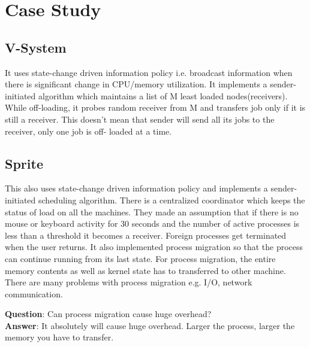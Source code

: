 \documentclass[twoside]{article}
\begin{document}
\section{Case Study}
\subsection{V-System}
It uses state-change driven information policy i.e. broadcast information when there is significant change in CPU/memory utilization. It implements a sender-initiated algorithm which maintains a list of M least loaded nodes(receivers). While off-loading, it probes random receiver from M and transfers job only if it is still a receiver. This doesn't mean that sender will send all its jobs to the receiver, only one job is off- loaded at a time. 

\subsection{Sprite}
This also uses state-change driven information policy and implements a sender-initiated scheduling algorithm. There is a centralized coordinator which keeps the status of load on all the machines. They made an assumption that if there is no mouse or keyboard activity for 30 seconds and the number of active processes is less than a threshold it becomes a receiver. Foreign processes get terminated when the user returns. It also implemented process migration so that the process can continue running from its last state. For process migration, the entire memory contents as well as kernel state has to transferred to other machine. There are many problems with process migration e.g. I/O, network communication.

\textbf{Question}: Can process migration cause huge overhead?\\
\textbf{Answer}: It absolutely will cause huge overhead. Larger the process, larger the memory you have to transfer.\\

 
\end{document}

